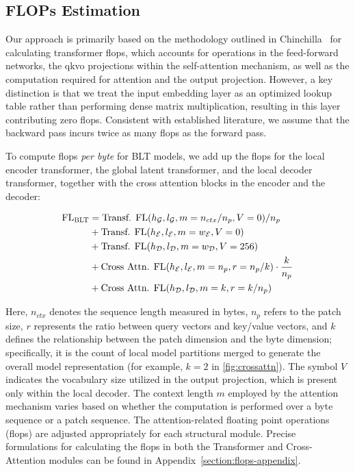 \subsection{FLOPs Estimation} 
\label{section:flops}

Our approach is primarily based on the methodology outlined in Chinchilla~\citep{hoffmann2022training} for calculating transformer flops, which accounts for operations in the feed-forward networks, the qkvo projections within the self-attention mechanism, as well as the computation required for attention and the output projection. However, a key distinction is that we treat the input embedding layer as an optimized lookup table rather than performing dense matrix multiplication, resulting in this layer contributing zero flops. Consistent with established literature, we assume that the backward pass incurs twice as many flops as the forward pass.

To compute flops \textit{per byte} for {\textsc BLT} models, we add up the flops for the local encoder transformer, the global latent transformer, and the local decoder transformer, together with the cross attention blocks in the encoder and the decoder:

\begin{align}
    \text{FL}_{\text{{\textsc BLT}}} &= \text{Transf. FL}(h_{\mathcal{G}}, l_{\mathcal{G}}, m=n_{ctx}/n_p,V=0) / n_p\\
   &+\text{Transf. FL}(h_{\mathcal{E}}, l_{\mathcal{E}}, m=w_{\mathcal{E}}, V=0) \\
   &+ \text{Transf. FL}(h_{\mathcal{D}}, l_{\mathcal{D}}, m=w_{\mathcal{D}}, V=256) \\ 
    &+ \text{Cross Attn. FL}(h_{\mathcal{E}}, l_{\mathcal{E}}, m=n_p, r=n_p/k) \cdot \frac{k}{n_p} \\ 
   &+ \text{Cross Attn. FL}(h_{\mathcal{D}}, l_{\mathcal{D}}, m=k, r=k/n_p) 
\end{align}

Here, $n_{ctx}$ denotes the sequence length measured in bytes, $n_p$ refers to the patch size, $r$ represents the ratio between query vectors and key/value vectors, and $k$ defines the relationship between the patch dimension and the byte dimension; specifically, it is the count of local model partitions merged to generate the overall model representation (for example, $k=2$ in \autoref{fig:crossattn}). The symbol $V$ indicates the vocabulary size utilized in the output projection, which is present only within the local decoder. The context length $m$ employed by the attention mechanism varies based on whether the computation is performed over a byte sequence or a patch sequence. The attention-related floating point operations (flops) are adjusted appropriately for each structural module. Precise formulations for calculating the flops in both the Transformer and Cross-Attention modules can be found in Appendix~\ref{section:flops-appendix}.

